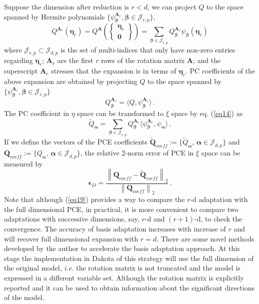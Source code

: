 Suppose the dimension after reduction is $r<d$, we can project $Q$ to the space spanned by Hermite polynomials $\{ \psi_{ \bm{\beta} }^{ \bm{A}_r }, \bm\beta \in \mathcal{J}_{r,p}\}$,
\begin{equation}
\label{eq10}
{Q}^{\bm{A}_r}(\bm{\eta}_r)
= {Q}^{\bm{A}}\left(\begin{Bmatrix} \bm{\eta}_r \\ \bm{0} \end{Bmatrix}\right)
= \sum_{\bm{\beta}\in\mathcal{J}_{r,p}} Q_{\bm{\beta}}^{\bm{A}_r} \psi_{\bm{\beta}}(\bm{\eta}_r)
\end{equation}
where $\mathcal{J}_{r,p}\subset\mathcal{J}_{d,p}$ is the set of multi-indices that only have non-zero entries regarding $\bm{\eta}_r$; $\bm{A}_r$ are the first $r$ rows of the rotation matrix $\bm{A}$; and the superscript $\bm{A}_r$ stresses that the expansion is in terms of $\bm{\eta}_r$. PC coefficients of the above expansion are obtained by projecting $Q$ to the space spanned by $\{\psi_{\bm{\beta}}^{\bm{A}_r}, \bm\beta \in \mathcal{J}_{r,p}\}$
\begin{equation}
\label{eq11}
Q_{\bm{\beta}}^{\bm{A}_r} = \langle Q, \psi_{ \bm{\beta}}^{\bm{A}_r} \rangle\,.
\end{equation}
The PC coefficient in $\eta$ space can be transformed to $\xi$ space by eq. (\ref{eq14}) as
\begin{equation}
\tilde{Q}_{\bm{\alpha}} = \sum_{\bm{\beta}\in\mathcal{J}_{r,p}} Q_{\bm{\beta}}^{\bm{A}_r} \langle \psi_{\bm{\beta}}^{\bm{A}_r}, \psi_{\bm \alpha} \rangle\,.
\end{equation}
If we define the vectors of the PCE coefficients $\tilde{\bm{Q}}_{coeff} := \{\tilde{Q}_{\bm{\alpha}},\, \bm{\alpha}\in\mathcal{J}_{d,p}\}$ and $\bm{Q}_{coeff} := \{Q_{\bm{\alpha}},\, \bm{\alpha}\in\mathcal{J}_{d,p}\}$, the relative 2-norm error of PCE in $\xi$ space can be measured by
\begin{equation}
\label{eq19}
\bm{\epsilon}_D = \frac{\left\| \bm{Q}_{coeff} - \tilde{\bm{Q}}_{coeff} \right\|_2} {\left\| \bm{Q}_{coeff} \right\|_2} \,.
\end{equation}
Note that although (\ref{eq19}) provides a way to compare the $r$-d adaptation with the full dimensional PCE, in practical, it is more convenient to compare two adaptations with successive dimensions, say, $r$-d and $(r+1)$-d, to check the convergence. The accuracy of basis adaptation increases with increase of $r$ and will recover full dimensional expansion with $r=d$. There are some novel methods developed by the author to accelerate the basis adaptation approach. At this stage the implementation in Dakota of this strategy will use the full dimension of the original model, \textit{i.e.} the rotation matrix is not truncated and the model is expressed in a different variable set. Although the rotation matrix is explicitly reported and it can be used to obtain information about the significant directions of the model. 

